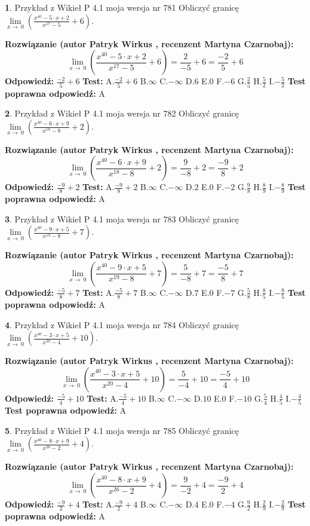 \documentclass[12pt, a4paper]{article}
\theoremstyle{definition} %
\newtheorem{zad}{}
\newcommand{\zadStart}[1]{\begin{zad}#1\newline}
\newcommand{\zadStop}{\end{zad}}
\newcommand{\rozwStart}[2]{\noindent \textbf{Rozwiązanie (autor #1 , recenzent #2): }\newline}
\newcommand{\rozwStop}{\newline}
\newcommand{\odpStart}{\noindent \textbf{Odpowiedź:}\newline}
\newcommand{\odpStop}{\newline}
\newcommand{\testStart}{\noindent \textbf{Test:}\newline}
\newcommand{\testStop}{\newline}
\newcommand{\kluczStart}{\noindent \textbf{Test poprawna odpowiedź:}\newline}
\newcommand{\kluczStop}{\newline}
\begin{document}
\zadStart{Przykład z Wikieł P 4.1 moja wersja nr 781}
Obliczyć granicę $\lim\limits_{x\to\ 0}(\frac{x^{40}-5 \cdot x +2}{x^{17}-5}+6)$.
\zadStop
\rozwStart{Patryk Wirkus}{Martyna Czarnobaj}
$$\lim\limits_{x\to\ 0}(\frac{x^{40}-5 \cdot x +2}{x^{17}-5}+6)=\frac{2}{-5}+6=\frac{-2}{5}+6$$
\rozwStop
\odpStart
$\frac{-2}{5}+6$
\odpStop
\testStart
A.$\frac{-2}{5}+6$
B.$\infty$
C.$-\infty$
D.$6$
E.$0$
F.$-6$
G.$\frac{2}{5}$
H.$\frac{5}{2}$
I.$-\frac{5}{2}$
\testStop
\kluczStart
A
\kluczStop



\zadStart{Przykład z Wikieł P 4.1 moja wersja nr 782}
Obliczyć granicę $\lim\limits_{x\to\ 0}(\frac{x^{40}-6 \cdot x +9}{x^{18}-8}+2)$.
\zadStop
\rozwStart{Patryk Wirkus}{Martyna Czarnobaj}
$$\lim\limits_{x\to\ 0}(\frac{x^{40}-6 \cdot x +9}{x^{18}-8}+2)=\frac{9}{-8}+2=\frac{-9}{8}+2$$
\rozwStop
\odpStart
$\frac{-9}{8}+2$
\odpStop
\testStart
A.$\frac{-9}{8}+2$
B.$\infty$
C.$-\infty$
D.$2$
E.$0$
F.$-2$
G.$\frac{9}{8}$
H.$\frac{8}{9}$
I.$-\frac{8}{9}$
\testStop
\kluczStart
A
\kluczStop



\zadStart{Przykład z Wikieł P 4.1 moja wersja nr 783}
Obliczyć granicę $\lim\limits_{x\to\ 0}(\frac{x^{40}-9 \cdot x +5}{x^{19}-8}+7)$.
\zadStop
\rozwStart{Patryk Wirkus}{Martyna Czarnobaj}
$$\lim\limits_{x\to\ 0}(\frac{x^{40}-9 \cdot x +5}{x^{19}-8}+7)=\frac{5}{-8}+7=\frac{-5}{8}+7$$
\rozwStop
\odpStart
$\frac{-5}{8}+7$
\odpStop
\testStart
A.$\frac{-5}{8}+7$
B.$\infty$
C.$-\infty$
D.$7$
E.$0$
F.$-7$
G.$\frac{5}{8}$
H.$\frac{8}{5}$
I.$-\frac{8}{5}$
\testStop
\kluczStart
A
\kluczStop



\zadStart{Przykład z Wikieł P 4.1 moja wersja nr 784}
Obliczyć granicę $\lim\limits_{x\to\ 0}(\frac{x^{40}-3 \cdot x +5}{x^{20}-4}+10)$.
\zadStop
\rozwStart{Patryk Wirkus}{Martyna Czarnobaj}
$$\lim\limits_{x\to\ 0}(\frac{x^{40}-3 \cdot x +5}{x^{20}-4}+10)=\frac{5}{-4}+10=\frac{-5}{4}+10$$
\rozwStop
\odpStart
$\frac{-5}{4}+10$
\odpStop
\testStart
A.$\frac{-5}{4}+10$
B.$\infty$
C.$-\infty$
D.$10$
E.$0$
F.$-10$
G.$\frac{5}{4}$
H.$\frac{4}{5}$
I.$-\frac{4}{5}$
\testStop
\kluczStart
A
\kluczStop



\zadStart{Przykład z Wikieł P 4.1 moja wersja nr 785}
Obliczyć granicę $\lim\limits_{x\to\ 0}(\frac{x^{40}-8 \cdot x +9}{x^{26}-2}+4)$.
\zadStop
\rozwStart{Patryk Wirkus}{Martyna Czarnobaj}
$$\lim\limits_{x\to\ 0}(\frac{x^{40}-8 \cdot x +9}{x^{26}-2}+4)=\frac{9}{-2}+4=\frac{-9}{2}+4$$
\rozwStop
\odpStart
$\frac{-9}{2}+4$
\odpStop
\testStart
A.$\frac{-9}{2}+4$
B.$\infty$
C.$-\infty$
D.$4$
E.$0$
F.$-4$
G.$\frac{9}{2}$
H.$\frac{2}{9}$
I.$-\frac{2}{9}$
\testStop
\kluczStart
A
\kluczStop
\end{document}
